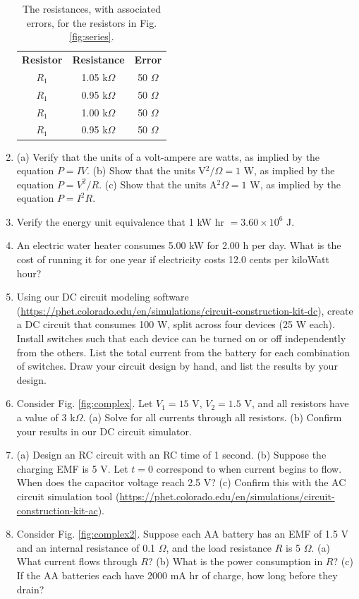 \documentclass[12pt,twocolumn]{article}
\begin{document}
\begin{enumerate}
\begin{table}
\centering
\begin{tabular}{| c | c | c |}
\hline
\textbf{Resistor} & \textbf{Resistance} & \textbf{Error} \\
$R_1$ & 1.05 k$\Omega$ & 50 $\Omega$ \\
$R_1$ & 0.95 k$\Omega$ & 50 $\Omega$ \\
$R_1$ & 1.00 k$\Omega$ & 50 $\Omega$ \\
$R_1$ & 0.95 k$\Omega$ & 50 $\Omega$ \\
\hline
\end{tabular}
\caption{\label{tab:2} The resistances, with associated errors, for the resistors in Fig. \ref{fig:series}.}
\end{table}
\item (a) Verify that the units of a volt-ampere are watts, as implied by the equation $P=IV$. (b) Show that the units V$^2/\Omega=1$ W, as implied by the equation $P = V^2/R$. (c) Show that the units A$^2 \Omega=1$ W, as implied by the equation $P = I^2 R$.
\item Verify the energy unit equivalence that 1 kW hr $= 3.60\times 10^6$ J.
\item An electric water heater consumes 5.00 kW for 2.00 h per day. What is the cost of running it for one year if electricity costs 12.0 cents per kiloWatt hour?
\item Using our DC circuit modeling software (\url{https://phet.colorado.edu/en/simulations/circuit-construction-kit-dc}), create a DC circuit that consumes 100 W, split across four devices (25 W each).  Install switches such that each device can be turned on or off independently from the others.  List the total current from the battery for each combination of switches.  Draw your circuit design by hand, and list the results by your design.
\item Consider Fig. \ref{fig:complex}.  Let $V_1 = 15$ V, $V_2 = 1.5$ V, and all resistors have a value of $3$ k$\Omega$. (a) Solve for all currents through all resistors.  (b) Confirm your results in our DC circuit simulator.
\item (a) Design an RC circuit with an RC time of 1 second.  (b) Suppose the charging EMF is 5 V.  Let $t=0$ correspond to when current begins to flow.  When does the capacitor voltage reach 2.5 V? (c) Confirm this with the AC circuit simulation tool (\url{https://phet.colorado.edu/en/simulations/circuit-construction-kit-ac}).
\item Consider Fig. \ref{fig:complex2}. Suppose each AA battery has an EMF of 1.5 V and an internal resistance of 0.1 $\Omega$, and the load resistance $R$ is 5 $\Omega$.  (a) What current flows through $R$? (b) What is the power consumption in $R$? (c) If the AA batteries each have 2000 mA hr of charge, how long before they drain?
\end{enumerate}
\end{document}
